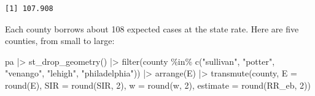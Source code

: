 \documentclass[
  letterpaper,
  DIV=11,
  numbers=noendperiod]{scrartcl}
\newenvironment{Shaded}{\begin{snugshade}}{\end{snugshade}}
\newcommand{\AttributeTok}[1]{\textcolor[rgb]{0.40,0.45,0.13}{#1}}
\newcommand{\CommentTok}[1]{\textcolor[rgb]{0.37,0.37,0.37}{#1}}
\newcommand{\DecValTok}[1]{\textcolor[rgb]{0.68,0.00,0.00}{#1}}
\newcommand{\FunctionTok}[1]{\textcolor[rgb]{0.28,0.35,0.67}{#1}}
\newcommand{\NormalTok}[1]{\textcolor[rgb]{0.00,0.23,0.31}{#1}}
\newcommand{\OtherTok}[1]{\textcolor[rgb]{0.00,0.23,0.31}{#1}}
\newcommand{\SpecialCharTok}[1]{\textcolor[rgb]{0.37,0.37,0.37}{#1}}
\newcommand{\StringTok}[1]{\textcolor[rgb]{0.13,0.47,0.30}{#1}}
\begin{document}
\begin{Shaded}
\end{Shaded}

\begin{verbatim}
[1] 107.908
\end{verbatim}

\begin{Shaded}
\end{Shaded}

Each county borrows about 108 expected cases at the state rate. Here are
five counties, from small to large:

\begin{Shaded}
\begin{Highlighting}[]
\NormalTok{pa }\SpecialCharTok{|\textgreater{}}
  \FunctionTok{st\_drop\_geometry}\NormalTok{() }\SpecialCharTok{|\textgreater{}}
  \FunctionTok{filter}\NormalTok{(county }\SpecialCharTok{\%in\%} \FunctionTok{c}\NormalTok{(}\StringTok{"sullivan"}\NormalTok{, }\StringTok{"potter"}\NormalTok{, }\StringTok{"venango"}\NormalTok{, }\StringTok{"lehigh"}\NormalTok{, }\StringTok{"philadelphia"}\NormalTok{)) }\SpecialCharTok{|\textgreater{}}
  \FunctionTok{arrange}\NormalTok{(E) }\SpecialCharTok{|\textgreater{}}
  \FunctionTok{transmute}\NormalTok{(county, }\AttributeTok{E =} \FunctionTok{round}\NormalTok{(E), }\AttributeTok{SIR =} \FunctionTok{round}\NormalTok{(SIR, }\DecValTok{2}\NormalTok{),}
            \AttributeTok{w =} \FunctionTok{round}\NormalTok{(w, }\DecValTok{2}\NormalTok{), }\AttributeTok{estimate =} \FunctionTok{round}\NormalTok{(RR\_eb, }\DecValTok{2}\NormalTok{))}
\end{Highlighting}
\end{Shaded}
\end{document}
